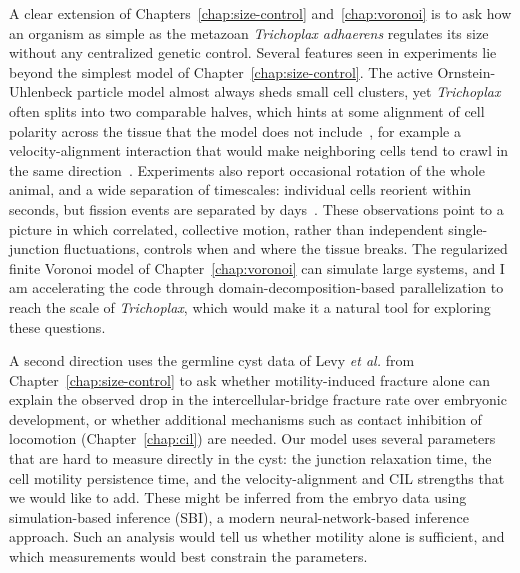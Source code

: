 A clear extension of Chapters~\ref{chap:size-control} and~\ref{chap:voronoi} is to ask how an organism as simple as the metazoan \textit{Trichoplax adhaerens} regulates its size without any centralized genetic control.
Several features seen in experiments lie beyond the simplest model of Chapter~\ref{chap:size-control}.
The active Ornstein-Uhlenbeck particle model almost always sheds small cell clusters, yet \textit{Trichoplax} often splits into two comparable halves, which hints at some alignment of cell polarity across the tissue that the model does not include~\cite{davidescu2023growth}, for example a velocity-alignment interaction that would make neighboring cells tend to crawl in the same direction~\cite{camley2014velocity}.
Experiments also report occasional rotation of the whole animal, and a wide separation of timescales: individual cells reorient within seconds, but fission events are separated by days~\cite{leria2026fast, prakash2021motility}.
These observations point to a picture in which correlated, collective motion, rather than independent single-junction fluctuations, controls when and where the tissue breaks.
The regularized finite Voronoi model of Chapter~\ref{chap:voronoi} can simulate large systems, and I am accelerating the code through domain-decomposition-based parallelization to reach the scale of \textit{Trichoplax}, which would make it a natural tool for exploring these questions.

A second direction uses the germline cyst data of Levy \textit{et al.} from Chapter~\ref{chap:size-control} to ask whether motility-induced fracture alone can explain the observed drop in the intercellular-bridge fracture rate over embryonic development, or whether additional mechanisms such as contact inhibition of locomotion (Chapter~\ref{chap:cil}) are needed.
Our model uses several parameters that are hard to measure directly in the cyst: the junction relaxation time, the cell motility persistence time, and the velocity-alignment and CIL strengths that we would like to add.
These might be inferred from the embryo data using simulation-based inference (SBI), a modern neural-network-based inference approach.
Such an analysis would tell us whether motility alone is sufficient, and which measurements would best constrain the parameters.
